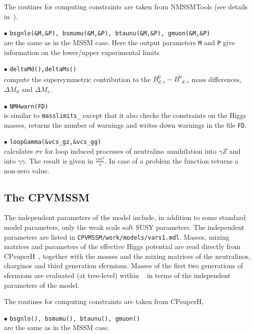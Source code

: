 \documentclass[12pt,a4paper]{article}
\begin{document}
The routines for computing constraints are taken from NMSSMTools (see details  in~\cite{Belanger:2006is}).

\noindent
$\bullet$ {\tt bsgnlo(\&M,\&P), bsmumu(\&M,\&P), btaunu(\&M,\&P),  gmuon(\&M,\&P)}\\ 
are the same as in the MSSM case.  Here the output parameters {\tt M} and {\tt P} 
give information on the lower/upper experimental limits ~\cite{Domingo:2007dx}



\noindent$\bullet$ \verb|deltaMd(),deltaMs()|\\
compute the supersymmetric contribution to the $B^0_{d,s}-\overline{B^0}_{d,s}$ mass differences, $\Delta M_d$ and $\Delta M_s$.

\noindent$\bullet$ \verb|NMHwarn(FD)|\\
is similar to {\tt masslimits\_} except that it also checks the 
constraints on the Higgs masses, returns the number of warnings and 
writes down  warnings in the file \verb|FD|.  

\noi$\bullet$ \verb|loopGamma(&vcs_gz,&vcs_gg)|\\
calculates $\sigma v$ for  loop induced processes of neutralino
annihilation into $\gamma Z$ and into $\gamma \gamma$. The result is given in  
$\frac{cm^3}{s}$. In case of a problem the function returns a non-zero value. 


\subsection{The CPVMSSM}

The independent parameters of the model include,
in addition to some standard model parameters, only the weak scale soft SUSY parameters.
The independent parameters are listed in \verb|CPVMSSM/work/models/vars1.mdl|. 
Masses,
mixing matrices and parameters of the effective Higgs potential are read
directly from CPsuperH~\cite{Lee:2003nta,Lee:2007gn}, together with the masses and
the mixing matrices of the neutralinos, charginos and third generation
sfermions.  Masses of the first two generations
of sfermions are evaluated (at tree-level) within \micro~ in
terms of the independent parameters of the model.

The routines for computing constraints are taken from CPsuperH,~\cite{CPSUPERH}


\noindent
$\bullet$ {\tt bsgnlo(), bsmumu(), btaunu(), gmuon() }\\  
are the same as in the MSSM case.\\
\end{document}
